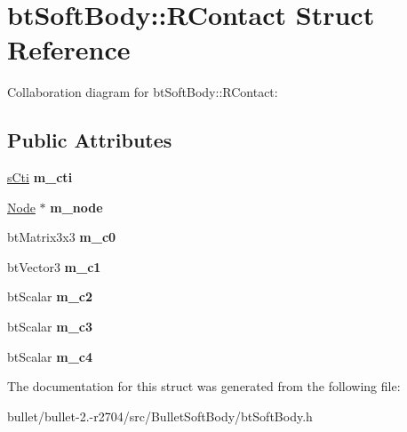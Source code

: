 \hypertarget{structbt_soft_body_1_1_r_contact}{\section{bt\+Soft\+Body\+:\+:R\+Contact Struct Reference}
\label{structbt_soft_body_1_1_r_contact}
}


Collaboration diagram for bt\+Soft\+Body\+:\+:R\+Contact\+:
\subsection*{Public Attributes}
\begin{DoxyCompactItemize}
\item 
\hypertarget{structbt_soft_body_1_1_r_contact_a16d3320b0ec49e9bad6b9589c04cfe50}{\hyperlink{structbt_soft_body_1_1s_cti}{s\+Cti} {\bfseries m\+\_\+cti}}\label{structbt_soft_body_1_1_r_contact_a16d3320b0ec49e9bad6b9589c04cfe50}

\item 
\hypertarget{structbt_soft_body_1_1_r_contact_a91e08172ca7278478dabda95881dffcb}{\hyperlink{structbt_soft_body_1_1_node}{Node} $\ast$ {\bfseries m\+\_\+node}}\label{structbt_soft_body_1_1_r_contact_a91e08172ca7278478dabda95881dffcb}

\item 
\hypertarget{structbt_soft_body_1_1_r_contact_a9ac99e80f862a19452fc2b451c979b9d}{bt\+Matrix3x3 {\bfseries m\+\_\+c0}}\label{structbt_soft_body_1_1_r_contact_a9ac99e80f862a19452fc2b451c979b9d}

\item 
\hypertarget{structbt_soft_body_1_1_r_contact_a6eadf65f297f841a8d065d5cc071334b}{bt\+Vector3 {\bfseries m\+\_\+c1}}\label{structbt_soft_body_1_1_r_contact_a6eadf65f297f841a8d065d5cc071334b}

\item 
\hypertarget{structbt_soft_body_1_1_r_contact_a10f62432bbbb1ed4f2003ced24a3e7a7}{bt\+Scalar {\bfseries m\+\_\+c2}}\label{structbt_soft_body_1_1_r_contact_a10f62432bbbb1ed4f2003ced24a3e7a7}

\item 
\hypertarget{structbt_soft_body_1_1_r_contact_ab22964c6cd93a7b8cf12f4f5b4d0556e}{bt\+Scalar {\bfseries m\+\_\+c3}}\label{structbt_soft_body_1_1_r_contact_ab22964c6cd93a7b8cf12f4f5b4d0556e}

\item 
\hypertarget{structbt_soft_body_1_1_r_contact_a5da2bf761efb065f9951826f9fe796b1}{bt\+Scalar {\bfseries m\+\_\+c4}}\label{structbt_soft_body_1_1_r_contact_a5da2bf761efb065f9951826f9fe796b1}

\end{DoxyCompactItemize}


The documentation for this struct was generated from the following file\+:\begin{DoxyCompactItemize}
\item 
bullet/bullet-\/2.-\/r2704/src/\+Bullet\+Soft\+Body/bt\+Soft\+Body.\+h\end{DoxyCompactItemize}
